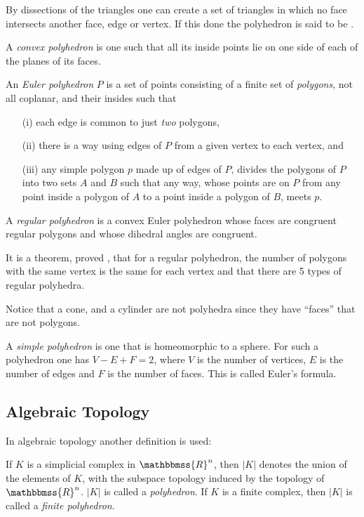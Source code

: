 \documentclass{article}
\newcommand{\mathbb}[1]{\mathbbmss{#1}}
\begin{document}
By dissections of the triangles one can create a set of triangles in which
no face intersects another face, edge or vertex. If this done the
polyhedron is said to be \emph{}.
 
A \emph{convex polyhedron} is one such that all its inside points lie on one side of
each of the planes of its faces. 

An \emph{Euler polyhedron}  $P$ is a set of points consisting of a finite set
of \emph{polygons}, not all coplanar, and their insides such that
\begin{itemize}
\item[(i)] each edge is common to just \emph{two} polygons, 
\item[(ii)] there is a way using edges of $P$ from a given vertex to each vertex, and
\item[(iii)] any simple polygon $p$ made up of edges of $P$, divides the polygons
of $P$ into two sets  $A$ and $B$ such that any way, whose points are on $P$
from any point inside a polygon of $A$ to a point inside a polygon of $B$,
meets $p$. 
\end{itemize}

A \emph{regular polyhedron} is a convex Euler polyhedron whose faces are congruent 
regular polygons and whose dihedral angles are congruent.

It is a theorem, proved , that for a regular polyhedron, the number of polygons with the same
vertex is the same for each vertex and that there are 5 types of regular polyhedra.


Notice that a cone, and a cylinder are not polyhedra since they have ``faces'' that are not polygons.

A \emph{simple polyhedron} is one that is homeomorphic to a sphere. For such a polyhedron
one has $V-E+F = 2$, where $V$ is the number of vertices, $E$ is the number of edges
and $F$ is the number of faces. This is called Euler's formula. 

\subsection*{Algebraic Topology}
In algebraic topology another definition is used:

If $K$ is a simplicial complex in ${\mathbb{R}}^n$, then $|K|$ denotes the union of the elements of 
$K$, with the subspace topology induced by the topology of ${\mathbb{R}}^n$.
$|K|$ is called a \emph{polyhedron}. If $K$ is a finite complex, then
$|K|$ is called a \emph{finite polyhedron}.
\end{document}
